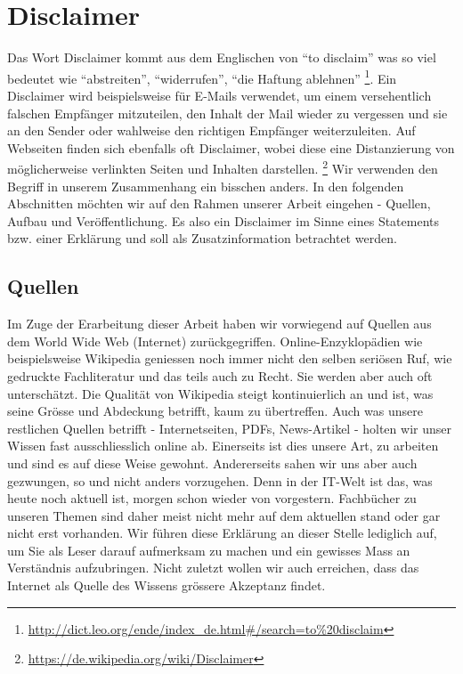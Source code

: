 \section{Disclaimer}
Das Wort Disclaimer kommt aus dem Englischen von ``to disclaim'' was so viel bedeutet wie ``abstreiten'', ``widerrufen'', ``die Haftung ablehnen''
\footnote{\url{http://dict.leo.org/ende/index_de.html\#/search=to\%20disclaim}}.
Ein Disclaimer wird beispielsweise für E-Mails verwendet, um einem versehentlich falschen Empfänger mitzuteilen, den Inhalt der Mail wieder zu vergessen und sie an den Sender oder wahlweise den richtigen Empfänger weiterzuleiten. Auf Webseiten finden sich ebenfalls oft Disclaimer, wobei diese eine Distanzierung von möglicherweise verlinkten Seiten und Inhalten darstellen.
\footnote{\url{https://de.wikipedia.org/wiki/Disclaimer}}
Wir verwenden den Begriff in unserem Zusammenhang ein bisschen anders. In den folgenden Abschnitten möchten wir auf den Rahmen unserer Arbeit eingehen - Quellen, Aufbau und Veröffentlichung. Es also ein Disclaimer im Sinne eines Statements bzw. einer Erklärung und soll als Zusatzinformation betrachtet werden.

\subsection{Quellen}
Im Zuge der Erarbeitung dieser Arbeit haben wir vorwiegend auf Quellen aus dem World Wide Web (Internet) zurückgegriffen. Online-Enzyklopädien wie beispielsweise Wikipedia geniessen noch immer nicht den selben seriösen Ruf, wie gedruckte Fachliteratur und das teils auch zu Recht. Sie werden aber auch oft unterschätzt. Die Qualität von Wikipedia steigt kontinuierlich an und ist, was seine Grösse und Abdeckung betrifft, kaum zu übertreffen. Auch was unsere restlichen Quellen betrifft - Internetseiten, PDFs, News-Artikel - holten wir unser Wissen fast ausschliesslich online ab. Einerseits ist dies unsere Art, zu arbeiten und sind es auf diese Weise gewohnt. Andererseits sahen wir uns aber auch gezwungen, so und nicht anders vorzugehen. Denn in der IT-Welt ist das, was heute noch aktuell ist, morgen schon wieder von vorgestern. Fachbücher zu unseren Themen sind daher meist nicht mehr auf dem aktuellen stand oder gar nicht erst vorhanden. Wir führen diese Erklärung an dieser Stelle lediglich auf, um Sie als Leser darauf aufmerksam zu machen und ein gewisses Mass an Verständnis aufzubringen. Nicht zuletzt wollen wir auch erreichen, dass das Internet als Quelle des Wissens grössere Akzeptanz findet.

